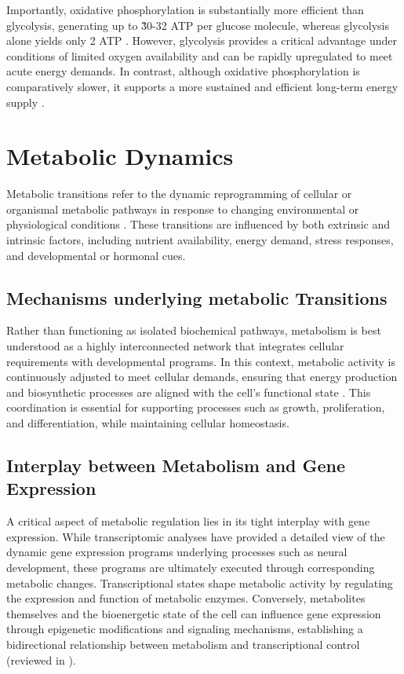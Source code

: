 Importantly, oxidative phosphorylation is substantially more efficient than glycolysis, generating up to \~ 30-32 ATP per glucose molecule, whereas glycolysis alone yields only 2 ATP \citep{mookerjeeQuantifyingIntracellularRates2017}.
However, glycolysis provides a critical advantage under conditions of limited oxygen availability and can be rapidly upregulated to meet acute energy demands. In contrast, although oxidative phosphorylation is comparatively slower, it supports a more sustained and efficient long-term energy supply \citep{melkonianBiochemistryAnaerobicGlycolysis2026}.

\section{Metabolic Dynamics}
Metabolic transitions refer to the dynamic reprogramming of cellular or organismal metabolic pathways in response to changing environmental or physiological conditions \citep{ETCHEGARAYInterplayMetabolismEpigenetics2016}.
These transitions are influenced by both extrinsic and intrinsic factors, including nutrient availability, energy demand, stress responses, and developmental or hormonal cues. 

\subsection{Mechanisms underlying metabolic Transitions}
Rather than functioning as isolated biochemical pathways, metabolism is best understood as a highly interconnected network that integrates cellular requirements with developmental programs. In this context, metabolic activity is continuously adjusted to meet cellular demands, ensuring that energy production and biosynthetic processes are aligned with the cell’s functional state \citep{CHANDELSignalingMetabolism2021,WANGMetaboliteSensingSignaling2018}.
This coordination is essential for supporting processes such as growth, proliferation, and differentiation, while maintaining cellular homeostasis. 

\subsection{Interplay between Metabolism and Gene Expression}
A critical aspect of metabolic regulation lies in its tight interplay with gene expression. While transcriptomic analyses have provided a detailed view of the dynamic gene expression programs underlying processes such as neural development, these programs are ultimately executed through corresponding metabolic changes. Transcriptional states shape metabolic activity by regulating the expression and function of metabolic enzymes. Conversely, metabolites  themselves  and the bioenergetic state of the cell can influence gene expression through epigenetic modifications and signaling mechanisms, establishing a bidirectional relationship between metabolism and transcriptional control (reviewed in \citep{CARTHEWGeneRegulationCellular2021,TARAZONAExploringInfluenceCell2020}).
\\

